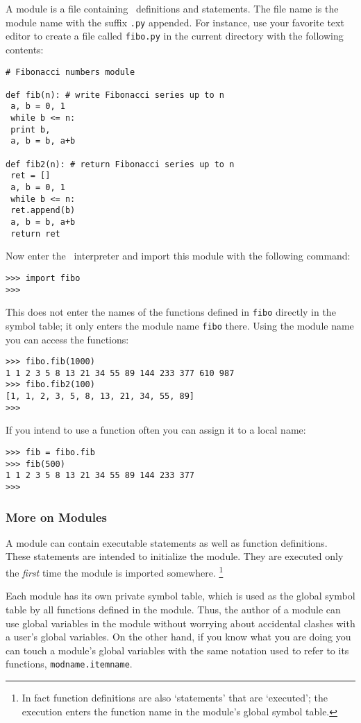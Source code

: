 A module is a file containing \Python\ definitions and statements.
The file name is the module name with the suffix
{\tt .py}
appended.
For instance, use your favorite text editor to create a file called
{\tt fibo.py}
in the current directory with the following contents:
\bcode\begin{verbatim}
# Fibonacci numbers module

def fib(n): # write Fibonacci series up to n
 a, b = 0, 1
 while b <= n:
 print b,
 a, b = b, a+b

def fib2(n): # return Fibonacci series up to n
 ret = []
 a, b = 0, 1
 while b <= n:
 ret.append(b)
 a, b = b, a+b
 return ret
\end{verbatim}\ecode
Now enter the \Python\ interpreter and import this module with the
following command:
\bcode\begin{verbatim}
>>> import fibo
>>>
\end{verbatim}\ecode
This does not enter the names of the functions defined in
{\tt fibo}
directly in the symbol table; it only enters the module name
{\tt fibo}
there.
Using the module name you can access the functions:
\bcode\begin{verbatim}
>>> fibo.fib(1000)
1 1 2 3 5 8 13 21 34 55 89 144 233 377 610 987
>>> fibo.fib2(100)
[1, 1, 2, 3, 5, 8, 13, 21, 34, 55, 89]
>>>
\end{verbatim}\ecode
If you intend to use a function often you can assign it to a local name:
\bcode\begin{verbatim}
>>> fib = fibo.fib
>>> fib(500)
1 1 2 3 5 8 13 21 34 55 89 144 233 377
>>>
\end{verbatim}\ecode

\subsubsection{More on Modules}

A module can contain executable statements as well as function
definitions.
These statements are intended to initialize the module.
They are executed only the
{\em first}
time the module is imported somewhere.%
\footnote{
 In fact function definitions are also `statements' that are
 `executed'; the execution enters the function name in the
 module's global symbol table.
}

Each module has its own private symbol table, which is used as the
global symbol table by all functions defined in the module.
Thus, the author of a module can use global variables in the module
without worrying about accidental clashes with a user's global
variables.
On the other hand, if you know what you are doing you can touch a
module's global variables with the same notation used to refer to its
functions,
{\tt modname.itemname}.

